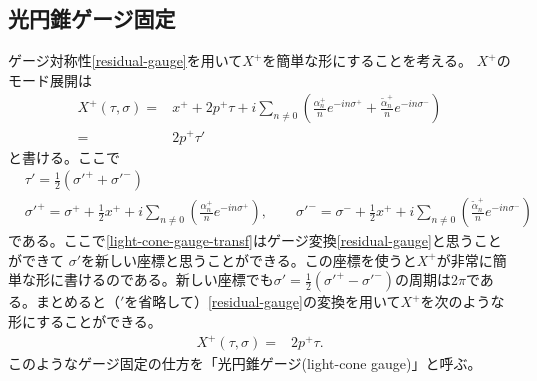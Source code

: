 \documentclass[report,paper=a4, fontsize=12pt, line_length=16cm, number_of_lines=33,dvipdfmx]{jlreq}
\numberwithin{equation}{chapter}
\numberwithin{equation}{section}
\newcommand{\alphat}{\tilde{\alpha}}
\begin{document}
\subsection{光円錐ゲージ固定}
ゲージ対称性\eqref{residual-gauge}を用いて$X^{+}$を簡単な形にすることを考える。
$X^{+}$のモード展開は
\begin{align}
X^{+}(\tau,\sigma)=&x^{+}+2p^{+}\tau+i\sum_{n\ne 0} \left(
\frac{\alpha^{+}_{n}}{n}e^{-in\sigma^{+}}
+\frac{\alphat^{+}_{n}}{n}e^{-in\sigma^{-}}
\right)\\
=&2p^{+}\tau'
\end{align}
と書ける。ここで
\begin{align}
&\tau'=\frac12(\sigma'^{+}+\sigma'^{-})\\
&
\sigma'^{+}=\sigma^{+}+\frac12x^{+}+i\sum_{n\ne 0} \left(
\frac{\alpha^{+}_{n}}{n}e^{-in\sigma^{+}}
\right),\qquad
\sigma'^{-}=\sigma^{-}+\frac12x^{+}+i\sum_{n\ne 0} \left(
\frac{\alphat^{+}_{n}}{n}e^{-in\sigma^{-}}
\right)\label{light-cone-gauge-transf}
\end{align}
である。ここで\eqref{light-cone-gauge-transf}はゲージ変換\eqref{residual-gauge}と思うことができて
$\sigma'$を新しい座標と思うことができる。この座標を使うと$X^{+}$が非常に簡単な形に書けるのである。新しい座標でも$\sigma'=\frac12(\sigma'^{+}-\sigma'^{-})$の周期は$2\pi$である。まとめると（${}'$を省略して）\eqref{residual-gauge}の変換を用いて$X^{+}$を次のような形にすることができる。
\begin{align}
X^{+}(\tau,\sigma)=&2p^{+}\tau.
\label{light-cone-gauge-fixing}
\end{align}
このようなゲージ固定の仕方を「光円錐ゲージ(light-cone gauge)」と呼ぶ。
\end{document}
